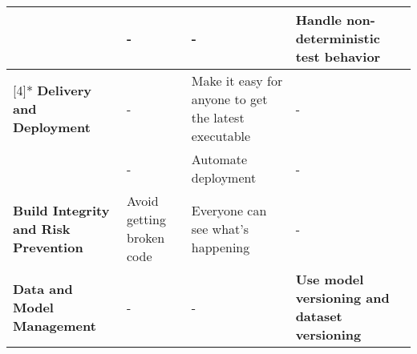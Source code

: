 \begin{table}[]
\begin{tabular}{>{\arraybackslash}p{2.0cm}>{\arraybackslash}p{2.5cm}>{\arraybackslash}p{2.8cm}>{\arraybackslash}p{2.8cm}}
& - & - & 
\textbf{Handle non-deterministic test behavior} \bigstrut\\
\midrule
\multirow[t]{4}[4]{*}
{\parbox[t]{2cm}{\textbf{Delivery and Deployment}}} & 
- & Make it easy for anyone to get the latest executable & - \bigstrut\\
\cmidrule{2-4}

& - & Automate deployment & - \bigstrut\\
\midrule

\parbox[t][1cm][t]{2cm}{\textbf{Build Integrity and Risk Prevention}} & 
Avoid getting broken code & Everyone can see what's happening & - \bigstrut\\
\midrule

\parbox[t][0.7cm][t]{2cm}{\textbf{Data and Model Management}} & 
- & - & \parbox[t][][t]{2.8cm}{\textbf{Use model versioning and dataset versioning}} \bigstrut\\
\bottomrule
\end{tabular}
\end{table}

